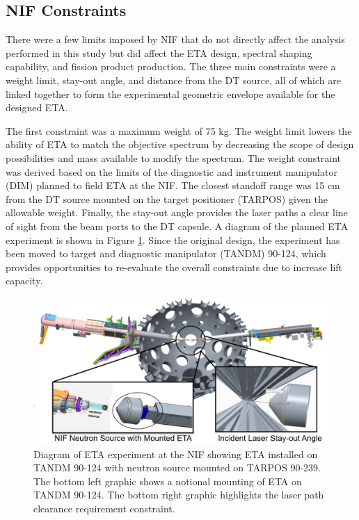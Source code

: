\subsection{NIF Constraints}

There were a few limits imposed by NIF that do not directly affect the analysis performed in this study but did affect the ETA design, spectral shaping capability, and fission product production. 
The three main constraints were a weight limit, stay-out angle, and distance from the DT source, all of which are linked together to form the experimental geometric envelope available for the designed ETA. 

The first constraint was a maximum weight of 75 kg. 
The weight limit lowers the ability of ETA to match the objective spectrum by decreasing the scope of design possibilities and mass available to modify the spectrum. 
The weight constraint was derived based on the limits of the diagnostic and instrument manipulator (DIM) planned to field ETA at the NIF. 
The closest standoff range was 15 cm from the DT source mounted on the target positioner (TARPOS) given the allowable weight. 
Finally, the stay-out angle provides the laser paths a clear line of sight from the beam ports to the DT capsule. 
A diagram of the planned ETA experiment is shown in Figure \ref{fig:exp}.
Since the original design, the experiment has been moved to target and diagnostic manipulator (TANDM) 90-124, which provides opportunities to re-evaluate the overall constraints due to increase lift capacity.

\begin{figure}[hbt!]
	\includegraphics[width=\linewidth]{Figures/Chapter3/Experimental_Setup.png}
	\caption[Diagram of ETA experiment at the NIF showing ETA installed on TANDM 90-124 with neutron source mounted on TARPOS 90-239.]{Diagram of ETA experiment at the NIF showing ETA installed on TANDM 90-124 with neutron source mounted on TARPOS 90-239. The bottom left graphic shows a notional mounting of ETA on TANDM 90-124. The bottom right graphic highlights the laser path clearance requirement constraint.}
	\label{fig:exp}
\end{figure}

